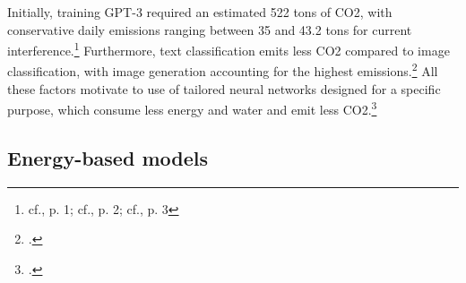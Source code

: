 Initially, training GPT-3 required an estimated 522 tons of CO2, with conservative daily emissions ranging between 35 and 43.2 tons for current interference.\footnote{cf.\cite{anon.CloserLookCarbon2023}, p. 1; cf.\cite{chienReducingCarbonImpact2023}, p. 2; cf.\cite{tomlinsonCarbonEmissionsWriting2024}, p. 3}
Furthermore, text classification emits less CO2 compared to image classification, with image generation accounting for the highest emissions.\footcite[cf.][1-14]{luccioniPowerHungryProcessing2023}
All these factors motivate to use of tailored neural networks designed for a specific purpose, which consume less energy and water and emit less CO2.\footcite[ibid cf.][1-14]{luccioniPowerHungryProcessing2023}

\subsection{Energy-based models}

